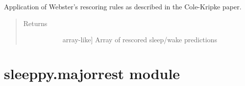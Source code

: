 \documentclass[letterpaper,10pt,english]{sphinxmanual}
\begin{document}
\begin{fulllineitems}
\begin{fulllineitems}
\label{\detokenize{index:sleeppy.colekripke.ColeKripke.rescore}}
Application of Webster’s rescoring rules as described in the Cole-Kripke paper.
\begin{quote}\begin{description}
\item[{Returns}] \leavevmode\begin{description}
\item[{}] \leavevmode{[}array-like{]}
Array of rescored sleep/wake predictions

\end{description}

\end{description}\end{quote}

\end{fulllineitems}


\end{fulllineitems}



\section{sleeppy.majorrest module}
\label{\detokenize{index:module-sleeppy.majorrest}}\label{\detokenize{index:sleeppy-majorrest-module}}
\end{document}
